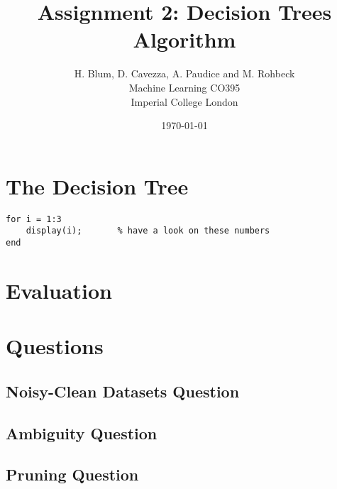 \documentclass{article}
\begin{document}
\author{H. Blum, D. Cavezza, A. Paudice and M. Rohbeck\\
 Machine Learning CO395\\
  Imperial College London}
\date{\today}
\title{Assignment 2: Decision Trees Algorithm}
\maketitle

\begin{abstract}
\lipsum[5]
\end{abstract}

\section{The Decision Tree}
\label{sec:theDecTree}
\lipsum[5]
\begin{lstlisting}
for i = 1:3
	display(i);       % have a look on these numbers
end
\end{lstlisting}

\section{Evaluation}
\label{sec:evaluation}
\lipsum[5]
\cite{test}

\section{Questions}
\label{sec:questions}

\subsection{Noisy-Clean Datasets Question}

\subsection{Ambiguity Question}

\subsection{Pruning Question}




\end{document}

